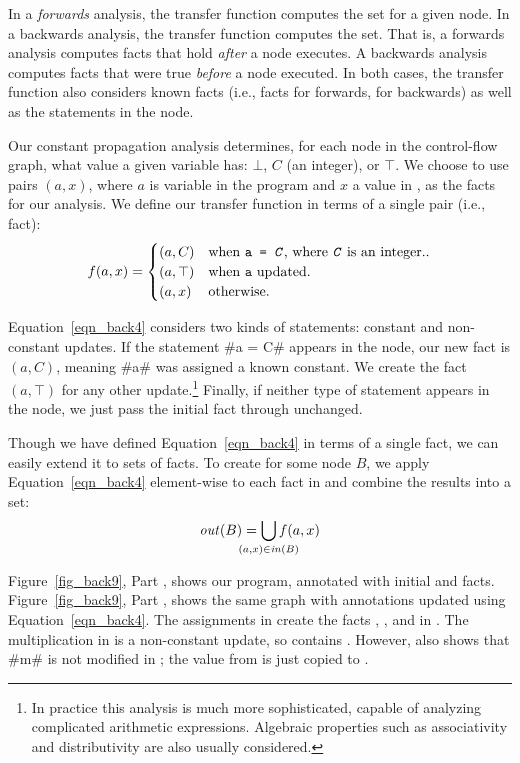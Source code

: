 \documentclass[12pt]{report}
\begin{document}
In a \emph{forwards} analysis, the transfer function computes the \out
set for a given node. In a backwards analysis, the transfer function
computes the \inE set. That is, a forwards analysis computes facts
that hold \emph{after} a node executes. A backwards analysis computes
facts that were true \emph{before} a node executed.  In both cases,
the transfer function also considers known facts (i.e., \inE facts for
forwards, \out for backwards) as well as the statements in the node.

Our constant propagation analysis determines, for each node in the
control-flow graph, what value a given variable has: $\bot$, $C$ (an
integer), or $\top$. We choose to use pairs $(a,x)$, where $a$ is
variable in the program and $x$ a value in \setLC, as the facts for
our analysis. We define our transfer function in terms of a single 
pair (i.e., fact):
\begin{equation}
  f (a,x) = 
  \begin{cases}
    (a,C) & \text{when \texttt{a = \emph{C}}, where \texttt{\emph{C}} is an integer.}. \\
    (a,\top) & \text{when \texttt{a} updated}. \\
    (a,x) & \text{otherwise}. \\
  \end{cases}
  \label{eqn_back4}
\end{equation}

Equation~\eqref{eqn_back4} considers two kinds of statements: constant
and non-constant updates. If the statement #a = C# appears in the
node, our new fact is $(a,C)$, meaning #a# was assigned a known
constant. We create the fact $(a,\top)$ for any other
update.\footnote{In practice this analysis is much more sophisticated,
  capable of analyzing complicated arithmetic expressions. Algebraic
  properties such as associativity and distributivity are also usually
  considered.} Finally, if neither type of statement appears in the
node, we just pass the initial fact through unchanged.

Though we have defined Equation~\eqref{eqn_back4} in terms of a single
fact, we can easily extend it to sets of facts. To create \outBa for
some node $B$, we apply Equation~\eqref{eqn_back4} element-wise to
each fact in \inBa and combine the results into a set:
\begin{equation}
  \outBa = \bigcup\limits_{\mathclap{(a,x) \in \inBa}} f(a,x)
  \label{eqn_back5}
\end{equation}

Figure~\ref{fig_back9}, Part , shows our
program, annotated with initial \inE and \out
facts. Figure~\ref{fig_back9}, Part , shows
the same graph with annotations updated using
Equation~\eqref{eqn_back4}. The assignments in
 create the facts ,
, and  in . The
multiplication in  is a non-constant update,
so  contains . However,
 also shows that #m# is not modified in
; the value from  is
just copied to .
\end{document}
